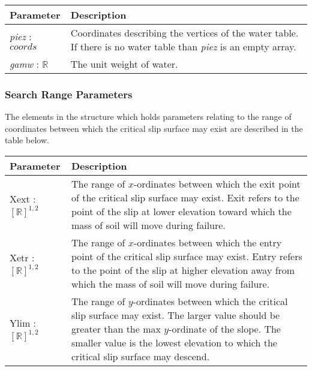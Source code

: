 \documentclass[12pt, titlepage]{article}
\begin{document}
\begin{center}
\begin{longtable}{ p{}
    p{}}\hline 
  \textbf{Parameter} & \textbf{Description}\\ \hline

  \textit{piez} : $coords$ & Coordinates describing the vertices of the water 
  table. If there is no water table than \textit{piez} is an empty array. \\

  \textit{gamw} : $\mathbb{R}$ & The unit weight of water. \\ \hline
\end{longtable}
\end{center}

\subsubsection{Search Range Parameters} \label{Tbl:SearchParam}
\noindent
The elements in the structure which holds parameters relating to 
the range of coordinates between which the critical slip surface may exist are 
described in the table below.

\begin{center}
\begin{tabular}{ p{}
    p{}}\hline 

  \textbf{Parameter} &
  \textbf{Description}\\ \hline

  Xext : $[\mathbb{R}]^{1,2}$ & The range of $x$-ordinates between which the 
  exit point of the critical slip surface may exist. Exit refers
  to the point of the slip at lower elevation toward which the mass of soil will
  move during failure. \\

  Xetr : $[\mathbb{R}]^{1,2}$ & The range of $x$-ordinates between which the
  entry point of the critical slip surface may exist. Entry
  refers to the point of the slip at higher elevation away from which the
  mass of soil will move during failure. \\

  Ylim : $[\mathbb{R}]^{1,2}$ & The range of $y$-ordinates between which
  the critical slip surface may exist. The larger value should be
  greater than the max $y$-ordinate of the slope. The smaller
  value is the lowest elevation to which the critical slip surface may 
  descend.\\ \hline
\end{tabular}
\end{center}
\end{document}
